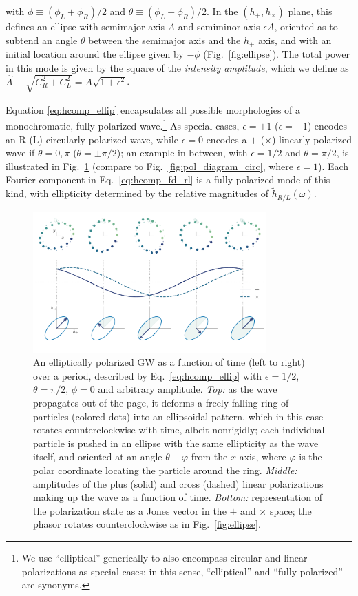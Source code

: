 \documentclass[aps,prd,twocolumn,superscriptaddress,preprintnumbers,floatfix,nofootinbib]{revtex4-2}
\begin{document}
with $\phi \equiv (\phi_L + \phi_R)/2$ and $\theta \equiv (\phi_L - \phi_R)/2$. 
In the $\left(h_+,h_\times\right)$ plane, this defines an ellipse with semimajor axis $A$ and semiminor axis $\epsilon A$, oriented as to subtend an angle $\theta$ between the semimajor axis and the $h_+$ axis, and with an initial location around the ellipse given by $-\phi$ (Fig.~\ref{fig:ellipse}).
The total power in this mode is given by the square of the \emph{intensity amplitude}, which we define as $\hat{A} \equiv \sqrt{C_R^2 + C_L^2} = A \sqrt{1 + \epsilon^2}$.

Equation \eqref{eq:hcomp_ellip} encapsulates all possible morphologies of a monochromatic, fully polarized wave.\footnote{We use ``elliptical'' generically to also encompass circular and linear polarizations as special cases; in this sense, ``elliptical'' and ``fully polarized'' are synonyms.}
As special cases, $\epsilon = +1$ ($\epsilon = -1$) encodes an R (L) circularly-polarized wave, while $\epsilon =0$ encodes a $+$ ($\times$) linearly-polarized wave if $\theta = 0,\pi$ ($\theta = \pm \pi/2$);
an example in between, with $\epsilon=1/2$ and $\theta = \pi/2$, is illustrated in Fig.~\ref{fig:pol_diagram_ellip} (compare to Fig.~\ref{fig:pol_diagram_circ}, where $\epsilon=1$).
Each Fourier component in Eq.~\eqref{eq:hcomp_fd_rl} is a fully polarized mode of this kind, with ellipticity determined by the relative magnitudes of $\tilde{h}_{R/L}(\omega)$.

\begin{figure}
\includegraphics[width=0.8\textwidth]{pol_diagram_ellip}
\caption{An elliptically polarized GW as a function of time (left to right) over a period, described by Eq.~\eqref{eq:hcomp_ellip} with $\epsilon=1/2$, $\theta=\pi/2$, $\phi=0$ and arbitrary amplitude. \emph{Top:} as the wave propagates out of the page, it deforms a freely falling ring of particles (colored dots) into an ellipsoidal pattern, which in this case rotates counterclockwise with time, albeit nonrigidly; each individual particle is pushed in an ellipse with the same ellipticity as the wave itself, and oriented at an angle $\theta + \varphi$ from the $x$-axis, where $\varphi$ is the polar coordinate locating the particle around the ring.
\emph{Middle:} amplitudes of the plus (solid) and cross (dashed) linear polarizations making up the wave as a function of time.
\emph{Bottom:} representation of the polarization state as a Jones vector in the $+$ and $\times$ space; the phasor rotates counterclockwise as in Fig.~\ref{fig:ellipse}.
}
\label{fig:pol_diagram_ellip}
\end{figure}
\end{document}
